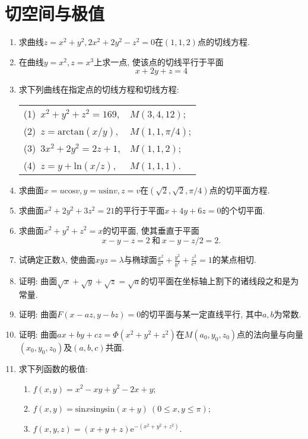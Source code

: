 \section{切空间与极值}
\begin{enumerate}
	\item 求曲线$z = x^2+y^2, 2x^2+2y^2-z^2=0$在$(1,1,2)$点的切线方程.
	\item 在曲线$y=x^2,z=x^3$上求一点, 使该点的切线平行于平面
	$$ x+2y+z = 4$$
	\item 求下列曲线在指定点的切线方程和切线方程:
\begin{table}[H]
	\begin{tabular}{ll}
		\qquad 	(1)\  $x^2+y^2+z^2=169$,\qquad \qquad& $M(3,4,12)$;\\
		\qquad	(2)\  $z=\mathrm{arctan}(x/y)$,\qquad \qquad & $M(1,1,\pi/4)$;\\
		\qquad	(3)\  $3x^2+2y^2=2z+1$, \qquad \qquad \qquad & $M(1,1,2)$;\\
		\qquad	(4)\  $z=y+\mathrm{ln}(x/z)$, \qquad \qquad & $M(1,1,1)$.
	\end{tabular}
\end{table}
\item 求曲面$x=u\mathrm{cos}v, y=u\mathrm{sin}v,z=v$在$(\sqrt{2},\sqrt{2},\pi/4)$点的切平面方程.
\item 求曲面$x^2+2y^2+3z^2=21$的平行于平面$x+4y+6z=0$的个切平面.
\item 求曲面$x^2+y^2+z^2=x$的切平面, 使其垂直于平面
$$ x-y -z = 2\ \text{和}\ x-y-z/2 = 2.$$
\item 试确定正数$\lambda$, 使曲面$xyz=\lambda$与椭球面$\frac{x^2}{a^2}+\frac{y^2}{b^2}+\frac{z^2}{c^2}=1$的某点相切.
\item 证明: 曲面$\sqrt{x}+\sqrt{y}+\sqrt{z}=\sqrt{a}$的切平面在坐标轴上割下的诸线段之和是为常量.
\item 证明: 曲面$F(x-az,y-bz)=0$的切平面与某一定直线平行, 其中$a,b$为常数.
\item 证明: 曲面$ax+by+cz = \varPhi(x^2+y^2+z^2)$在$M(a_0,y_0,z_0)$点的法向量与向量$(x_0,y_0,z_0)$及$(a,b,c)$共面.
\item 求下列函数的极值:
\begin{enumerate}
	\item $f(x,y)=x^2-xy+y^2-2x+y$;
	\item $f(x,y)=\mathrm{sin}x\mathrm{sin}y\mathrm{sin}(x+y)\ (0\le x, y\le \pi)$;
	\item $f(x,y,z) = (x+y+z)\mathrm{e}^{-(x^2+y^2+z^2)}$.
\end{enumerate}

\end{enumerate}
